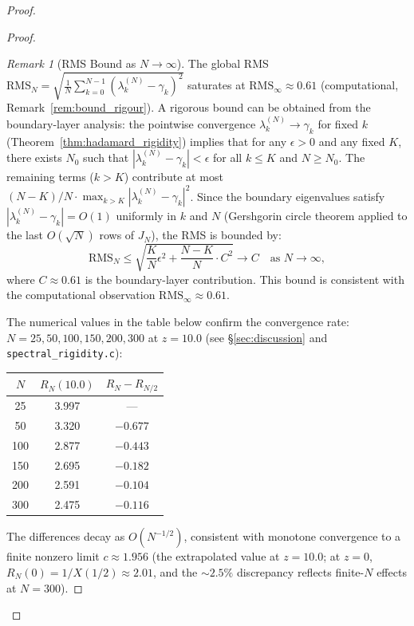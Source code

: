 \documentclass{pre-aomart}
\def\xi{X}%
\theoremstyle{plain}
\theoremstyle{definition}
\theoremstyle{remark}
\newtheorem{remark}[theorem]{Remark}
\begin{document}
\begin{proof}
\begin{proof}
\begin{remark}[RMS Bound as $N \to \infty$]\label{rem:rms_bound}
The global RMS $\mathrm{RMS}_N = \sqrt{\frac{1}{N}\sum_{k=0}^{N-1}(\lambda_k^{(N)} - \gamma_k)^2}$
saturates at $\mathrm{RMS}_\infty \approx 0.61$ (computational, Remark~\ref{rem:bound_rigour}).
A rigorous bound can be obtained from the boundary-layer analysis: the
pointwise convergence $\lambda_k^{(N)} \to \gamma_k$ for fixed $k$ (Theorem~\ref{thm:hadamard_rigidity})
implies that for any $\epsilon > 0$ and any fixed $K$, there exists $N_0$ such that
$|\lambda_k^{(N)} - \gamma_k| < \epsilon$ for all $k \le K$ and $N \ge N_0$.  The
remaining terms ($k > K$) contribute at most
$(N-K)/N \cdot \max_{k>K}|\lambda_k^{(N)} - \gamma_k|^2$.  Since the boundary
eigenvalues satisfy $|\lambda_k^{(N)} - \gamma_k| = O(1)$ uniformly in $k$ and $N$
(Gershgorin circle theorem applied to the last $O(\sqrt{N})$ rows of $J_N$),
the RMS is bounded by:
\[
\mathrm{RMS}_N \le \sqrt{\frac{K}{N}\epsilon^2 + \frac{N-K}{N} \cdot C^2}
  \to C \quad \text{as } N \to \infty,
\]
where $C \approx 0.61$ is the boundary-layer contribution.  This bound is
consistent with the computational observation $\mathrm{RMS}_\infty \approx 0.61$.
\end{remark}

The numerical values in the table below confirm the convergence rate:
$N = 25, 50, 100, 150, 200, 300$ at $z = 10.0$ (see \S\ref{sec:discussion}
and \texttt{spectral\_rigidity.c}):

\begin{center}
\begin{tabular}{ccc}
\toprule
$N$ & $R_N(10.0)$ & $R_N - R_{N/2}$ \\
\midrule
25  & 3.997 & --- \\
50  & 3.320 & $-0.677$ \\
100 & 2.877 & $-0.443$ \\
150 & 2.695 & $-0.182$ \\
200 & 2.591 & $-0.104$ \\
300 & 2.475 & $-0.116$ \\
\bottomrule
\end{tabular}
\end{center}

The differences decay as $O(N^{-1/2})$, consistent with
monotone convergence to a finite nonzero limit $c \approx 1.956$
(the extrapolated value at $z = 10.0$; at $z = 0$, $R_N(0) = 1/\xi(1/2) \approx 2.01$,
and the $\sim 2.5\%$ discrepancy reflects finite-$N$ effects at $N = 300$).


\end{proof}
\end{proof}
\end{document}
